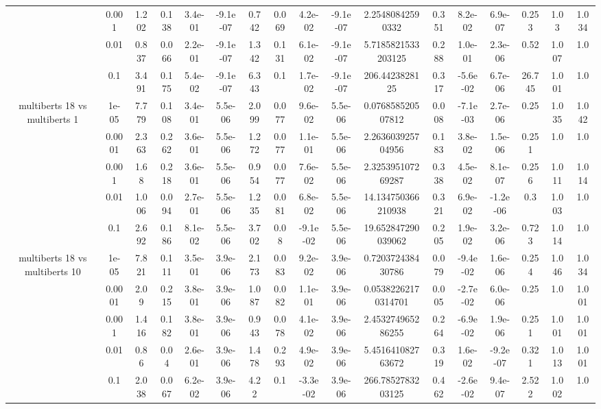 \begin{tabular}{|c|c|c|c|c|c|c|c|c|c|c|c|c|c|c|c|c|}
 & 0.001 & 1.202 & 0.138 & 3.4e-01 & -9.1e-07 & 0.742 & 0.069 & 4.2e-02 & -9.1e-07 & 2.25480842590332 & 0.351 & 8.2e-02 & 6.9e-07 & 0.253 & 1.03 & 1.034 \\
 & 0.01 & 0.837 & 0.066 & 2.2e-01 & -9.1e-07 & 1.342 & 0.131 & 6.1e-02 & -9.1e-07 & 5.7185821533203125 & 0.288 & 1.0e-01 & 2.3e-06 & 0.52 & 1.007 & 1.0 \\
 & 0.1 & 3.491 & 0.175 & 5.4e-02 & -9.1e-07 & 6.343 & 0.1 & 1.7e-02 & -9.1e-07 & 206.4423828125 & 0.317 & -5.6e-02 & 6.7e-06 & 26.745 & 1.001 & 1.0 \\
\hline
\multirow{5}{*}{multiberts 18 vs multiberts 1} & 1e-05 & 7.779 & 0.108 & 3.4e-01 & 5.5e-06 & 2.099 & 0.077 & 9.6e-02 & 5.5e-06 & 0.076858520507812 & 0.008 & -7.1e-03 & 2.7e-06 & 0.25 & 1.035 & 1.042 \\
 & 0.0001 & 2.363 & 0.262 & 3.6e-01 & 5.5e-06 & 1.272 & 0.077 & 1.1e-01 & 5.5e-06 & 2.263603925704956 & 0.183 & 3.8e-02 & 1.5e-06 & 0.251 & 1.0 & 1.0 \\
 & 0.001 & 1.68 & 0.218 & 3.6e-01 & 5.5e-06 & 0.954 & 0.077 & 7.6e-02 & 5.5e-06 & 2.325395107269287 & 0.338 & 4.5e-02 & 8.1e-07 & 0.256 & 1.011 & 1.014 \\
 & 0.01 & 1.006 & 0.094 & 2.7e-01 & 5.5e-06 & 1.235 & 0.081 & 6.8e-02 & 5.5e-06 & 14.134750366210938 & 0.321 & 6.9e-02 & -1.2e-06 & 0.3 & 1.003 & 1.0 \\
 & 0.1 & 2.692 & 0.186 & 8.1e-02 & 5.5e-06 & 3.702 & 0.08 & -9.1e-02 & 5.5e-06 & 19.652847290039062 & 0.205 & 1.9e-02 & 3.2e-06 & 0.723 & 1.014 & 1.0 \\
\hline
\multirow{5}{*}{multiberts 18 vs multiberts 10} & 1e-05 & 7.821 & 0.111 & 3.5e-01 & 3.9e-06 & 2.173 & 0.083 & 9.2e-02 & 3.9e-06 & 0.720372438430786 & 0.079 & -9.4e-02 & 1.6e-06 & 0.254 & 1.046 & 1.034 \\
 & 0.0001 & 2.09 & 0.215 & 3.8e-01 & 3.9e-06 & 1.087 & 0.082 & 1.1e-01 & 3.9e-06 & 0.05382262170314701 & 0.005 & -2.7e-02 & 6.0e-06 & 0.25 & 1.0 & 1.001 \\
 & 0.001 & 1.416 & 0.182 & 3.8e-01 & 3.9e-06 & 0.943 & 0.078 & 4.1e-02 & 3.9e-06 & 2.453274965286255 & 0.264 & -6.9e-02 & 1.9e-06 & 0.251 & 1.001 & 1.001 \\
 & 0.01 & 0.86 & 0.04 & 2.6e-01 & 3.9e-06 & 1.478 & 0.293 & 4.9e-02 & 3.9e-06 & 5.451641082763672 & 0.319 & 1.6e-02 & -9.2e-07 & 0.321 & 1.013 & 1.001 \\
 & 0.1 & 2.038 & 0.067 & 6.2e-02 & 3.9e-06 & 4.22 & 0.1 & -3.3e-02 & 3.9e-06 & 266.7852783203125 & 0.462 & -2.6e-02 & 9.4e-07 & 2.522 & 1.002 & 1.0 \\

\end{tabular}
